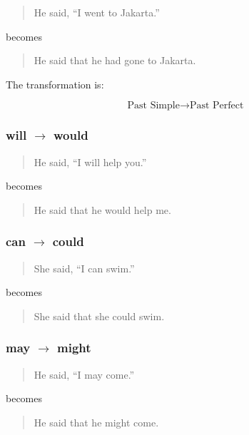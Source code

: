 \begin{quotation}
He said, ``I went to Jakarta.''
\end{quotation}

becomes

\begin{quotation}
He said that he had gone to Jakarta.
\end{quotation}

The transformation is:

\[
\text{Past Simple} \rightarrow \text{Past Perfect}
\]


\subsubsection{will $\rightarrow$ would}

\begin{quotation}
He said, ``I will help you.''
\end{quotation}

becomes

\begin{quotation}
He said that he would help me.
\end{quotation}


\subsubsection{can $\rightarrow$ could}

\begin{quotation}
She said, ``I can swim.''
\end{quotation}

becomes

\begin{quotation}
She said that she could swim.
\end{quotation}


\subsubsection{may $\rightarrow$ might}

\begin{quotation}
He said, ``I may come.''
\end{quotation}

becomes

\begin{quotation}
He said that he might come.
\end{quotation}
